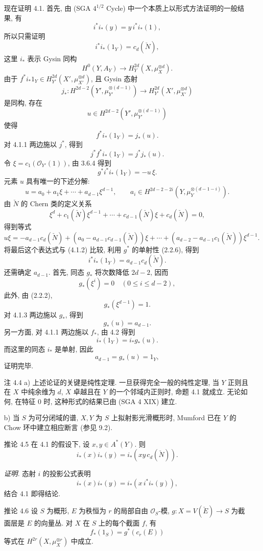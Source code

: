 现在证明 4.1. 首先, 由 (SGA $4^{1/2}$ Cycle) 中一个本质上以形式方法证明的一般结果, 有
\[
i^*i_*(y)=y\,i^*i_*(1),
\]
所以只需证明
\[
i^*i_*(1_Y)=c_d(\check N),
\]
这里 $i_*$ 表示 Gysin 同构
\[
H^0(Y,A_Y)\to H_Y^{2d}(X,\mu_X^{\otimes d}).
\]
由于 $f^*i_*1_Y\in H_{Y'}^{2d}(X',\mu_{X'}^{\otimes d})$, 且 Gysin 态射
\[
j_*:H^{2d-2}(Y',\mu_{Y'}^{\otimes(d-1)})
\to H_{Y'}^{2d}(X',\mu_{X'}^{\otimes d})
\]
是同构, 存在
\[
u\in H^{2d-2}(Y',\mu_{Y'}^{\otimes(d-1)})
\]
使得
\[
f^*i_*(1_Y)=j_*(u).
\tag{4.1.1}
\]
对 4.1.1 两边施以 $j^*$, 得到
\[
j^*f^*i_*(1_Y)=j^*j_*(u).
\]
令 $\xi=c_1(\mathcal O_{Y'}(1))$, 由 3.6.4 得到
\[
g^*i^*i_*(1_Y)=-u\,\xi.
\tag{4.1.2}
\]
元素 $u$ 具有唯一的下述分解:
\[
u=a_0+a_1\xi+\cdots+a_{d-1}\xi^{d-1},
\qquad
a_i\in H^{2d-2-2i}(Y,\mu_Y^{\otimes(d-1-i)}).
\tag{4.1.3}
\]
由 $\check N$ 的 Chern 类的定义关系
\[
\xi^d+c_1(\check N)\xi^{d-1}+\cdots+c_{d-1}(\check N)\xi+c_d(\check N)=0,
\tag{4.1.4}
\]
得到等式
\[
u\xi=-a_{d-1}c_d(\check N)+(a_0-a_{d-1}c_{d-1}(\check N))\xi
+\cdots+(a_{d-2}-a_{d-1}c_1(\check N))\xi^{d-1}.
\]
将最后这个表达式与 (4.1.2) 比较, 利用 $g^*$ 的单射性 (2.2.6), 得到
\[
i^*i_*(1_Y)=a_{d-1}c_d(\check N).
\tag{4.1.5}
\]
还需确定 $a_{d-1}$. 首先, 同态 $g_*$ 将次数降低 $2d-2$, 因而
\[
g_*(\xi^i)=0\quad(0\le i\le d-2),
\]
此外, 由 (2.2.2),
\[
g_*(\xi^{d-1})=1.
\]
对 4.1.3 两边施以 $g_*$, 得到
\[
g_*(u)=a_{d-1}.
\tag{4.1.6}
\]
另一方面, 对 4.1.1 两边施以 $f_*$, 由 4.2 得到
\[
i_*(1_Y)=i_*g_*(u).
\tag{4.1.7}
\]
而这里的同态 $i_*$ 是单射, 因此
\[
a_{d-1}=g_*(u)=1_Y,
\]
证明完毕.

\begin{statement}{注 4.4}
a) 上述论证的关键是纯性定理. 一旦获得完全一般的纯性定理, 当 $Y$ 正则且在 $X$ 中纯余维为 $d$, $X$ 卓越且在 $Y$ 的一个邻域内正则时, 命题 4.1 就成立. 无论如何, 在特征 $0$ 时, 这种形式的结果已由 (SGA 4 XIX) 建立.

b) 当 $S$ 为可分闭域的谱, $X,Y$ 为 $S$ 上拟射影光滑概形时, Mumford 已在 $Y$ 的 Chow 环中建立相应断言 (参见 9.2).
\end{statement}

\begin{statement}{推论 4.5}
在 4.1 的假设下, 设 $x,y\in A^*(Y)$. 则
\[
i_*(x)i_*(y)=i_*(xy\,c_d(\check N)).
\]
\end{statement}

\emph{证明.} 态射 $i$ 的投影公式表明
\[
i_*(x)i_*(y)=i_*(x\,i^*i_*(y)),
\]
结合 4.1 即得结论.

\begin{statement}{推论 4.6}
设 $S$ 为概形, $E$ 为秩恒为 $r$ 的局部自由 $\mathcal O_S$-模, $g:X=V(\check E)\to S$ 为截面层是 $E$ 的向量丛. 对 $X$ 在 $S$ 上的每个截面 $f$, 有
\[
f_*(1_S)=g^*(c_r(E))
\]
等式在 $H^{2r}(X,\mu_X^{\otimes r})$ 中成立.
\end{statement}

